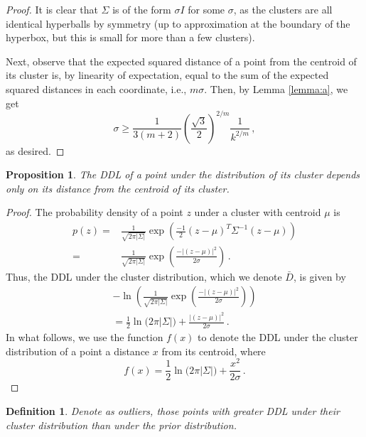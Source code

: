 \documentclass[a4paper,fleqn]{cas-sc}
\newtheorem{definition}[theorem]{Definition}
\newtheorem{proposition}{Proposition}
\theoremstyle{remark}
\begin{document}
\begin{proof}
It is clear that $\Sigma$ is of the form $\sigma I$ for some $\sigma$, as the clusters are all  identical hyperballs by symmetry (up to approximation at the boundary of the hyperbox, but this is small for more than a few clusters). 

Next, observe that the expected squared distance of a point from the centroid of its cluster is, by linearity of expectation, equal to the sum of the expected squared distances in each coordinate, i.e., $m\sigma$. Then, by Lemma \ref{lemma:a}, we get 
\[
\sigma \geq \frac{1}{3(m+2)}\left(\frac{\sqrt{3}}{2}\right)^{2/m}\frac{1}{k^{2/m}}\,,
\]
as desired.
\end{proof}

\begin{proposition} \label{proposition:fx}
The DDL of a point under the distribution of its cluster depends only on its distance from the centroid of its cluster.
\end{proposition}
\begin{proof}

The probability density of a point $z$ under a cluster with centroid $\mu$ is
\begin{align*}
p(z)    =& \frac{1}{\sqrt{2\pi |\Sigma|}}\exp{\left(\frac{-1}{2}(z-\mu)^T\Sigma^{-1}(z-\mu)\right)} \\
        =& \frac{1}{\sqrt{2\pi |\Sigma|}}\exp{\left(\frac{-|(z-\mu)|^2}{2\sigma}\right)} \,.
\end{align*}
Thus, the DDL under the cluster distribution, which we denote $\bar{D}$, is given by
\begin{gather*}
 -\ln{\left(\frac{1}{\sqrt{2\pi |\Sigma|}}\exp{\left(\frac{-|(z-\mu)|^2}{2\sigma}\right)}\right)} \\
        = \frac{1}{2} \ln{(2\pi |\Sigma|}) + \frac{|(z-\mu)|^2}{2\sigma} \,.
\end{gather*}
In what follows, we use the function $f(x)$ to denote the DDL under the cluster distribution of a point a distance $x$ from its centroid, where
\[
f(x) = \frac{1}{2} \ln{(2\pi |\Sigma|}) + \frac{x^2}{2\sigma} \,.
\]
\end{proof}

\begin{definition}
Denote as outliers, those points with greater DDL under their cluster distribution than under the prior distribution.
\end{definition}
 
\end{document}
